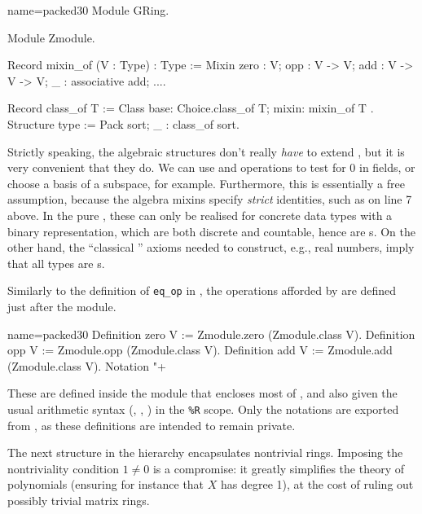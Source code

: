 \begin{coq}{name=packed30}{}
Module GRing.

Module Zmodule.

Record mixin_of (V : Type) : Type := Mixin {
  zero : V; opp : V -> V; add : V -> V -> V;
  _ : associative add;
  ...}.

Record class_of T := Class { base: Choice.class_of T; mixin: mixin_of T }.
Structure type := Pack {sort; _ : class_of sort}.
\end{coq}

Strictly speaking, the \mcbMC{} algebraic structures don't really
\emph{have} to extend , but it is very convenient that
they do.  We can use  and  operations to test
for 0 in fields, or choose a basis of a subspace, for example.
Furthermore, this is essentially a free assumption, because the
\mcbMC{} algebra mixins specify \emph{strict} identities, such as
 on line 7 above. In the pure \mcbCIC{}, these can only
be realised for concrete data types with a binary representation,
which are both discrete and countable, hence are s.  On
the other hand, the ``classical \mcbCIC{}'' axioms needed to construct,
e.g., real numbers, imply that all types are s.

Similarly to the definition of \lstinline/eq_op/ in , the
operations afforded by  are defined just after the
 module.

\begin{coq}{name=packed30}{}
Definition zero V := Zmodule.zero (Zmodule.class V).
Definition opp V := Zmodule.opp (Zmodule.class V).
Definition add V := Zmodule.add (Zmodule.class V).
Notation "+%
\end{coq}

These are defined inside the  module that encloses most of
, and also given the usual arithmetic syntax (,
, ) in the \lstinline/%R/
scope. Only the notations are
exported from , as these definitions are intended to remain
private.


The next structure in the hierarchy encapsulates nontrivial rings.
Imposing the nontriviality condition $1 \neq 0$ is a compromise:
it greatly simplifies the theory of polynomials (ensuring for instance that
$X$ has degree 1), at the cost of ruling out possibly trivial matrix rings.


